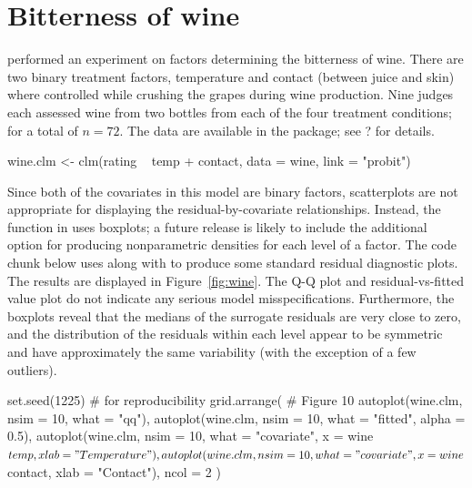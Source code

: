 \section{Bitterness of wine}

\citet{randal-analysis-1989} performed an experiment on factors determining the bitterness of wine. There are two binary treatment factors, temperature and contact (between juice and skin) where controlled while crushing the grapes during wine production. Nine judges each assessed wine from two bottles from each of the four treatment conditions; for a total of $n = 72$. The data are available in the  package; see ? for details.

\begin{example}
wine.clm <- clm(rating ~ temp + contact, data = wine, link = "probit")
\end{example}

Since both of the covariates in this model are binary factors, scatterplots are not appropriate for displaying the residual-by-covariate relationships. Instead, the  function in  uses boxplots; a future release is likely to include the additional option for producing nonparametric densities for each level of a factor. The code chunk below uses  along with  to produce some standard residual diagnostic plots. The results are displayed in Figure~\ref{fig:wine}. The Q-Q plot and residual-vs-fitted value plot do not indicate any serious model misspecifications. Furthermore, the boxplots reveal that the medians of the surrogate residuals are very close to zero, and the distribution of the residuals within each level appear to be symmetric and have approximately the same variability (with the exception of a few outliers).

\begin{example}
set.seed(1225)  # for reproducibility
grid.arrange(  # Figure 10
  autoplot(wine.clm, nsim = 10, what = "qq"),
  autoplot(wine.clm, nsim = 10, what = "fitted", alpha = 0.5),
  autoplot(wine.clm, nsim = 10, what = "covariate", x = wine$temp, 
           xlab = "Temperature"),
  autoplot(wine.clm, nsim = 10, what = "covariate", x = wine$contact,
           xlab = "Contact"),
  ncol = 2
)
\end{example}

